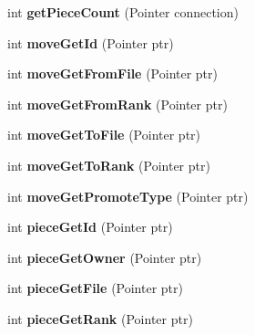 \begin{DoxyCompactItemize}
\item 
\hypertarget{interfaceClient_a8a8f318d62176bdfe0ddc7c776270fca}{
int {\bfseries getPieceCount} (Pointer connection)}
\label{interfaceClient_a8a8f318d62176bdfe0ddc7c776270fca}

\item 
\hypertarget{interfaceClient_ad3dfc9cd293e85e0f21c8dbaf89200f8}{
int {\bfseries moveGetId} (Pointer ptr)}
\label{interfaceClient_ad3dfc9cd293e85e0f21c8dbaf89200f8}

\item 
\hypertarget{interfaceClient_a7a86558ad65c59660e44c9e4c6d2815f}{
int {\bfseries moveGetFromFile} (Pointer ptr)}
\label{interfaceClient_a7a86558ad65c59660e44c9e4c6d2815f}

\item 
\hypertarget{interfaceClient_a164f5f09dd3aaaa20f3dd6199dd0d834}{
int {\bfseries moveGetFromRank} (Pointer ptr)}
\label{interfaceClient_a164f5f09dd3aaaa20f3dd6199dd0d834}

\item 
\hypertarget{interfaceClient_ac57c7a56bedebd47d82be8e9ee38e4e8}{
int {\bfseries moveGetToFile} (Pointer ptr)}
\label{interfaceClient_ac57c7a56bedebd47d82be8e9ee38e4e8}

\item 
\hypertarget{interfaceClient_ade447dc92d6b0a8e391f663474296f3b}{
int {\bfseries moveGetToRank} (Pointer ptr)}
\label{interfaceClient_ade447dc92d6b0a8e391f663474296f3b}

\item 
\hypertarget{interfaceClient_a5a83ce746d5752f1e419c90a7a6df658}{
int {\bfseries moveGetPromoteType} (Pointer ptr)}
\label{interfaceClient_a5a83ce746d5752f1e419c90a7a6df658}

\item 
\hypertarget{interfaceClient_a00d46242f8a76a382f76d85118d10f6e}{
int {\bfseries pieceGetId} (Pointer ptr)}
\label{interfaceClient_a00d46242f8a76a382f76d85118d10f6e}

\item 
\hypertarget{interfaceClient_a223207714420c4354c9fb3f48bb18a21}{
int {\bfseries pieceGetOwner} (Pointer ptr)}
\label{interfaceClient_a223207714420c4354c9fb3f48bb18a21}

\item 
\hypertarget{interfaceClient_a94b148d7079dcd6180b7435f0892cafc}{
int {\bfseries pieceGetFile} (Pointer ptr)}
\label{interfaceClient_a94b148d7079dcd6180b7435f0892cafc}

\item 
\hypertarget{interfaceClient_a05ba3f26aab59e0beb39d9c5adce5af6}{
int {\bfseries pieceGetRank} (Pointer ptr)}
\label{interfaceClient_a05ba3f26aab59e0beb39d9c5adce5af6}


\end{DoxyCompactItemize}

